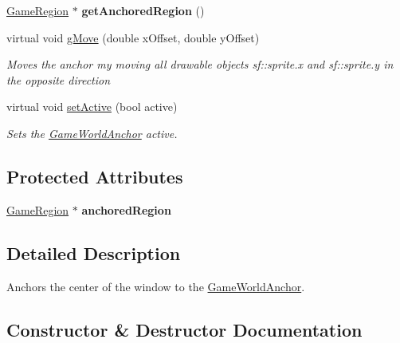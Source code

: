 \begin{DoxyCompactItemize}
\hyperlink{class_game_region}{Game\+Region} $\ast$ {\bfseries get\+Anchored\+Region} ()
\item 
virtual void \hyperlink{class_game_world_anchor_a35bafca13929710c6138950c7c38ec71}{g\+Move} (double x\+Offset, double y\+Offset)
\begin{DoxyCompactList}\small\item\em \textquotesingle{}Moves\textquotesingle{} the anchor my moving all drawable objects sf\+::sprite.\+x and sf\+::sprite.\+y in the opposite direction \end{DoxyCompactList}\item 
virtual void \hyperlink{class_game_world_anchor_accfec567c6edaa530ef6f5d5b5489d6b}{set\+Active} (bool active)
\begin{DoxyCompactList}\small\item\em Sets the \hyperlink{class_game_world_anchor}{Game\+World\+Anchor} active. \end{DoxyCompactList}\end{DoxyCompactItemize}
\subsection*{Protected Attributes}
\begin{DoxyCompactItemize}
\item 
\mbox{\label{class_game_world_anchor_a3efa7371cec833e9ed49478e70b28012}} 
\hyperlink{class_game_region}{Game\+Region} $\ast$ {\bfseries anchored\+Region}
\end{DoxyCompactItemize}


\subsection{Detailed Description}
Anchors the center of the window to the \hyperlink{class_game_world_anchor}{Game\+World\+Anchor}. 



\subsection{Constructor \& Destructor Documentation}
\mbox{\label{class_game_world_anchor_a9b0a0ee5f92e6fabee6f6e5adc7001a2}} 
